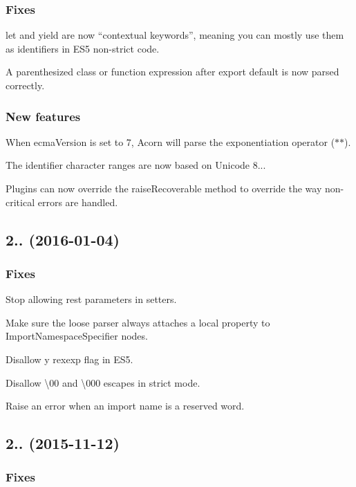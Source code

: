 \subsubsection*{Fixes}

{\ttfamily let} and {\ttfamily yield} are now “contextual keywords”, meaning you can mostly use them as identifiers in E\+S5 non-\/strict code.

A parenthesized class or function expression after {\ttfamily export default} is now parsed correctly.

\subsubsection*{New features}

When {\ttfamily ecma\+Version} is set to 7, Acorn will parse the exponentiation operator ({\ttfamily $\ast$$\ast$}).

The identifier character ranges are now based on Unicode 8...

Plugins can now override the {\ttfamily raise\+Recoverable} method to override the way non-\/critical errors are handled.

\subsection*{2.. (2016-\/01-\/04)}

\subsubsection*{Fixes}

Stop allowing rest parameters in setters.

Make sure the loose parser always attaches a {\ttfamily local} property to {\ttfamily Import\+Namespace\+Specifier} nodes.

Disallow {\ttfamily y} rexexp flag in E\+S5.

Disallow {\ttfamily \textbackslash{}00} and {\ttfamily \textbackslash{}000} escapes in strict mode.

Raise an error when an import name is a reserved word.

\subsection*{2.. (2015-\/11-\/12)}

\subsubsection*{Fixes}

